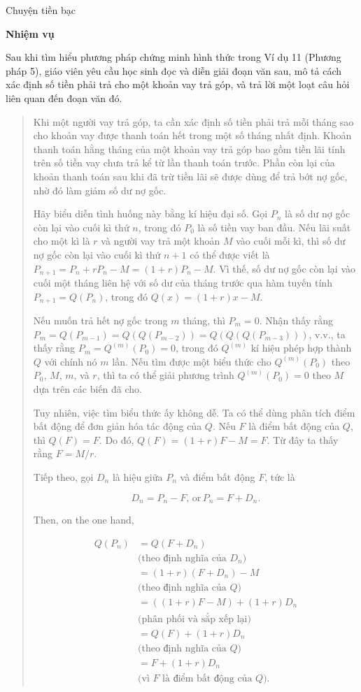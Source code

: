 \documentclass[
  10pt,
  a4paper,
  landscape,
  twoside,
  openany
]{scrbook}
\begin{document}
{Chuyện tiền bạc}
{
\noindent
\textbf{Nhiệm vụ}

Sau khi tìm hiểu phương pháp chứng minh hình thức trong Ví dụ 11 (Phương pháp 5), giáo viên yêu cầu học sinh đọc và diễn giải đoạn văn sau, mô tả cách xác định số tiền phải trả cho một khoản vay trả góp, và trả lời một loạt câu hỏi liên quan đến đoạn văn đó.

\begin{quotation}
  Khi một người vay trả góp, ta cần xác định số tiền phải trả mỗi tháng sao cho khoản vay được thanh toán hết trong một số tháng nhất định. Khoản thanh toán hằng tháng của một khoản vay trả góp bao gồm tiền lãi tính trên số tiền vay chưa trả kể từ lần thanh toán trước. Phần còn lại của khoản thanh toán sau khi đã trừ tiền lãi sẽ được dùng để trả bớt nợ gốc, nhờ đó làm giảm số dư nợ gốc.

Hãy biểu diễn tình huống này bằng kí hiệu đại số. Gọi $P_n$ là số dư nợ gốc còn lại vào cuối kì thứ $n$, trong đó $P_0$ là số tiền vay ban đầu. Nếu lãi suất cho một kì là $r$ và người vay trả một khoản $M$ vào cuối mỗi kì, thì số dư nợ gốc còn lại vào cuối kì thứ $n+1$ có thể được viết là $P_{n+1}=P_n+rP_n-M=(1+r)P_n-M$. Vì thế, số dư nợ gốc còn lại vào cuối một tháng liên hệ với số dư của tháng trước qua hàm tuyến tính $P_{n+1}=Q(P_n)$, trong đó $Q(x)=(1+r)x-M$.

Nếu muốn trả hết nợ gốc trong $m$ tháng, thì $P_m=0$. Nhận thấy rằng $P_m=Q(P_{m-1})=Q(Q(P_{m-2}))=Q(Q(Q(P_{m-3})))$, v.v., ta thấy rằng $P_m=Q^{(m)}(P_0)=0$, trong đó $Q^{(m)}$ kí hiệu phép hợp thành $Q$ với chính nó $m$ lần. Nếu tìm được một biểu thức cho $Q^{(m)}(P_0)$ theo $P_0$, $M$, $m$, và $r$, thì ta có thể giải phương trình $Q^{(m)}(P_0)=0$ theo $M$ dựa trên các biến đã cho.

Tuy nhiên, việc tìm biểu thức ấy không dễ. Ta có thể dùng phân tích điểm bất động để đơn giản hóa tác động của $Q$. Nếu $F$ là điểm bất động của $Q$, thì $Q(F)=F$. Do đó, $Q(F)=(1+r)F-M=F$. Từ đây ta thấy rằng $F=M/r$.

Tiếp theo, gọi $D_n$ là hiệu giữa $P_n$ và điểm bất động $F$, tức là

  $$
    D_n=P_n-F, \, \text{or} \, P_n=F+D_n.
  $$

  Then, on the one hand,

  \begin{align*}
  Q(P_n)
    &=Q(F+D_n) \\
      & \text{(theo định nghĩa của $D_n$)} \\
    &=(1+r)(F+D_n)-M \\
      & \text{(theo định nghĩa của $Q$)} \\
    &=((1+r)F-M)+(1+r)D_n \\
      & \text{(phân phối và sắp xếp lại)} \\
    &=Q(F)+(1+r)D_n \\
      & \text{(theo định nghĩa của $Q$)} \\
    &=F+(1+r)D_n \\
      & \text{(vì $F$ là điểm bất động của $Q$).}
\end{align*}


\end{quotation}}
\end{document}
